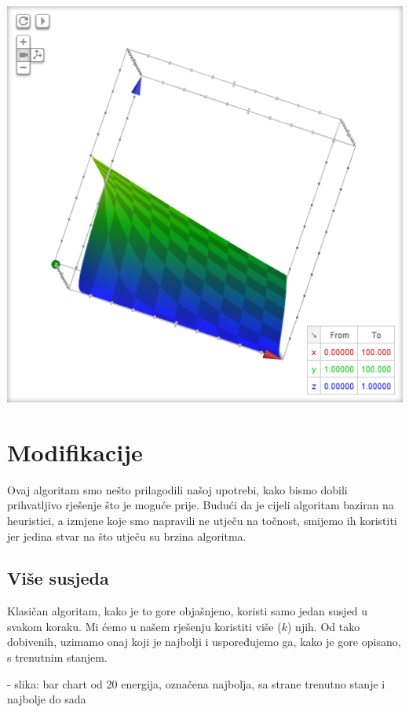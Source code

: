 \documentclass[times, utf8, zavrsni]{fer}
\begin{document}
\includegraphics{res/P_graf_de(0_100)_t(1,100).PNG}

\section{Modifikacije}

Ovaj algoritam smo nešto prilagodili našoj upotrebi, kako bismo dobili
prihvatljivo rješenje što je moguće prije. Budući da je cijeli
algoritam baziran na heuristici, a izmjene koje smo napravili
ne utječu na točnost, smijemo ih koristiti jer jedina stvar
na što utječu su brzina algoritma. 

\subsection{Više susjeda}
Klasičan algoritam, kako je to gore objašnjeno, koristi samo jedan susjed u svakom
koraku. Mi ćemo u našem rješenju koristiti više ($k$) njih. Od tako dobivenih,
uzimamo onaj koji je najbolji i uspoređujemo ga, kako je gore opisano,
s trenutnim stanjem. 

- slika: bar chart od 20 energija, označena najbolja, sa strane trenutno stanje i
najbolje do sada
\end{document}
